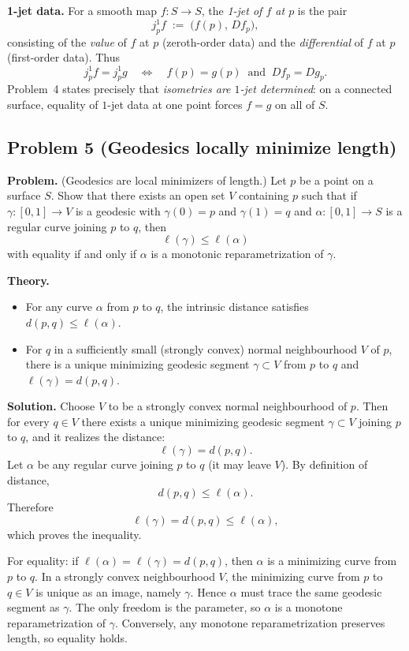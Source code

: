 \documentclass[12pt,a4paper]{article}
\theoremstyle{plain}
\theoremstyle{definition}      %
\begin{document}
\medskip
\textbf{1-jet data.}
For a smooth map $f:S\to S$, the \emph{1-jet of $f$ at $p$} is the pair
\[
j_p^1 f \;:=\; \bigl(f(p),\, Df_p\bigr),
\]
consisting of the \emph{value} of $f$ at $p$ (zeroth-order data) and the \emph{differential}
of $f$ at $p$ (first-order data). Thus
\[
j_p^1 f = j_p^1 g
\quad\Longleftrightarrow\quad
f(p)=g(p)\ \text{ and }\ Df_p=Dg_p.
\]
Problem~4 states precisely that \emph{isometries are $1$-jet determined}:
on a connected surface, equality of $1$-jet data at one point forces $f=g$ on all of $S$.


\subsection*{Problem 5 (Geodesics locally minimize length)}
\textbf{Problem.}
(Geodesics are local minimizers of length.) Let $p$ be a point on a surface $S$.
Show that there exists an open set $V$ containing $p$ such that if $\gamma:[0,1]\to V$ is a geodesic
with $\gamma(0)=p$ and $\gamma(1)=q$ and $\alpha:[0,1]\to S$ is a regular curve joining $p$ to $q$, then
\[
\ell(\gamma)\le \ell(\alpha)
\]
with equality if and only if $\alpha$ is a monotonic reparametrization of $\gamma$.

\medskip
\textbf{Theory.}
\begin{itemize}
	\item For any curve $\alpha$ from $p$ to $q$, the intrinsic distance satisfies $d(p,q)\le \ell(\alpha)$.
	\item For $q$ in a sufficiently small (strongly convex) normal neighbourhood $V$ of $p$,
	there is a unique minimizing geodesic segment $\gamma\subset V$ from $p$ to $q$ and
	$\ell(\gamma)=d(p,q)$.
\end{itemize}

\medskip
\textbf{Solution.}
Choose $V$ to be a strongly convex normal neighbourhood of $p$.
Then for every $q\in V$ there exists a unique minimizing geodesic segment $\gamma\subset V$
joining $p$ to $q$, and it realizes the distance:
\[
\ell(\gamma)=d(p,q).
\]
Let $\alpha$ be any regular curve joining $p$ to $q$ (it may leave $V$). By definition of distance,
\[
d(p,q)\le \ell(\alpha).
\]
Therefore
\[
\ell(\gamma)=d(p,q)\le \ell(\alpha),
\]
which proves the inequality.

For equality: if $\ell(\alpha)=\ell(\gamma)=d(p,q)$, then $\alpha$ is a minimizing curve from $p$ to $q$.
In a strongly convex neighbourhood $V$, the minimizing curve from $p$ to $q\in V$ is unique as an image,
namely $\gamma$. Hence $\alpha$ must trace the same geodesic segment as $\gamma$.
The only freedom is the parameter, so $\alpha$ is a monotone reparametrization of $\gamma$.
Conversely, any monotone reparametrization preserves length, so equality holds.
\end{document}
